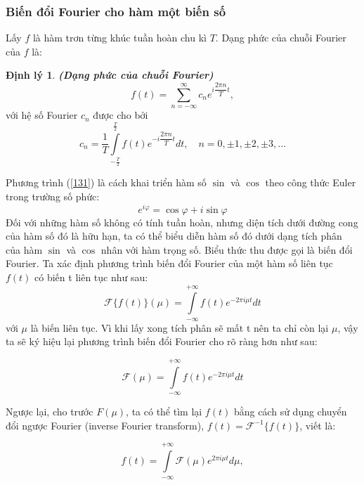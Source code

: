 \documentclass[12pt,a4paper]{report}
\numberwithin{equation}{section}
\theoremstyle{definition} %
\newtheorem{dl}{Định lý}[chapter]
\begin{document}
\subsubsection{Biến đổi Fourier cho hàm một biến số}
Lấy $f$ là hàm trơn từng khúc tuần hoàn chu kì $T$. Dạng phức của chuỗi Fourier của $f$ là: 
\begin{dl}	
\textbf{\textit{(Dạng phức của chuỗi Fourier)}}
\begin{equation}
	\label{131}
    f(t)= \sum_{n=-\infty} ^{\infty} c_ne^{i\dfrac{2\pi n}{T}t},
\end{equation}
với hệ số Fourier $c_n$ được cho bởi
\begin{equation}
	\label{132}
    c_n=\dfrac{1}{T}\displaystyle\int\limits_{-\frac{T}{2}}^{\frac{T}{2}} f(t)e^{-i\dfrac{2\pi n}{T}t}dt,\quad n=0,\pm 1,\pm 2, \pm 3,...
\end{equation}
\end{dl}
Phương trình (\ref{131}) là cách khai triển hàm số $\sin$ và $\cos$ theo công thức Euler trong trường số phức:
\begin{equation}
	\label{133}
    e^{i\varphi}=\cos\varphi+i \sin\varphi
\end{equation}
Đối với những hàm số không có tính tuần hoàn, nhưng diện tích dưới đường cong của hàm số đó là hữu hạn, ta có thể biểu diễn hàm số đó dưới dạng tích phân của hàm $\sin$ và $\cos$ nhân với hàm trọng số. Biểu thức thu được gọi là biến đổi Fourier.
Ta xác định phương trình biến đổi Fourier của một hàm số liên tục $f(t)$ có biến t liên tục như sau:
\begin{equation}
	\label{134}
    \mathcal{F}\{f(t)\}(\mu)=\int\limits_{-\infty}^{+\infty}f(t)e^{-2\pi i  \mu t}dt
\end{equation}
với $\mu$ là biến liên tục. Vì khi lấy xong tích phân sẽ mất t nên ta chỉ còn lại $\mu$, vậy ta sẽ ký hiệu lại phương trình biến đổi Fourier cho rõ ràng hơn như sau:

\begin{equation}
	\label{135}
  \mathcal{F}(\mu)=\int\limits_{-\infty}^{+\infty}f(t)e^{-2\pi i \mu t}dt
\end{equation}

Ngược lại, cho trước $F(\mu)$, ta có thể tìm lại $f(t)$ bằng cách sử dụng chuyển đổi ngược Fourier (inverse Fourier transform), $f(t)=\mathcal{F}^{-1}\{f(t)\}$, viết là:

\begin{equation}
	\label{136}
    f(t)=\int\limits_{-\infty}^{+\infty}\mathcal{F}(\mu)e^{2\pi i \mu t}d\mu,
\end{equation}
\end{document}
